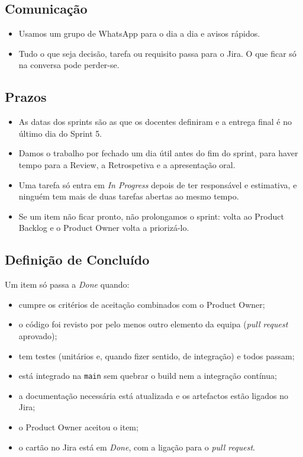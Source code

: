 \documentclass[11pt,a4paper]{article}
\begin{document}
\subsection{Comunicação}

\begin{itemize}
  \item Usamos um grupo de WhatsApp para o dia a dia e avisos rápidos.
  \item Tudo o que seja decisão, tarefa ou requisito passa para o Jira. O que ficar só na conversa pode perder-se.
\end{itemize}

\subsection{Prazos}

\begin{itemize}
  \item As datas dos sprints são as que os docentes definiram e a entrega final é no último dia do Sprint 5.
  \item Damos o trabalho por fechado um dia útil antes do fim do sprint, para haver tempo para a Review, a Retrospetiva e a apresentação oral.
  \item Uma tarefa só entra em \textit{In Progress} depois de ter responsável e estimativa, e ninguém tem mais de duas tarefas abertas ao mesmo tempo.
  \item Se um item não ficar pronto, não prolongamos o sprint: volta ao Product Backlog e o Product Owner volta a priorizá-lo.
\end{itemize}

\subsection{Definição de Concluído}

Um item só passa a \textit{Done} quando:

\begin{tcolorbox}[caixa, title={Definição de Concluído}, colback=azulclaro!40]
  \begin{itemize}[label=\textcolor{azul}{$\square$}]
    \item cumpre os critérios de aceitação combinados com o Product Owner;
    \item o código foi revisto por pelo menos outro elemento da equipa (\textit{pull request} aprovado);
    \item tem testes (unitários e, quando fizer sentido, de integração) e todos passam;
    \item está integrado na \texttt{main} sem quebrar o build nem a integração contínua;
    \item a documentação necessária está atualizada e os artefactos estão ligados no Jira;
    \item o Product Owner aceitou o item;
    \item o cartão no Jira está em \textit{Done}, com a ligação para o \textit{pull request}.
  \end{itemize}
\end{tcolorbox}
\end{document}
